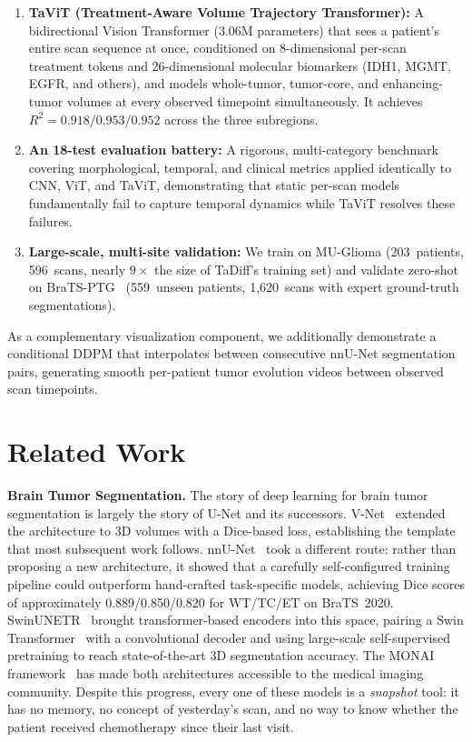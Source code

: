\documentclass[conference]{IEEEtran}
\begin{document}
\begin{enumerate}
    \item \textbf{TaViT (Treatment-Aware Volume Trajectory Transformer):} A bidirectional Vision Transformer (3.06M parameters) that sees a patient's entire scan sequence at once, conditioned on 8-dimensional per-scan treatment tokens and 26-dimensional molecular biomarkers (IDH1, MGMT, EGFR, and others), and models whole-tumor, tumor-core, and enhancing-tumor volumes at every observed timepoint simultaneously. It achieves $R^2 = 0.918/0.953/0.952$ across the three subregions.

    \item \textbf{An 18-test evaluation battery:} A rigorous, multi-category benchmark covering morphological, temporal, and clinical metrics applied identically to CNN, ViT, and TaViT, demonstrating that static per-scan models fundamentally fail to capture temporal dynamics while TaViT resolves these failures.

    \item \textbf{Large-scale, multi-site validation:} We train on MU-Glioma (203~patients, 596~scans, nearly $9\times$ the size of TaDiff's training set) and validate zero-shot on BraTS-PTG~\cite{deverdier2024bratsptg} (559~unseen patients, 1,620~scans with expert ground-truth segmentations).
\end{enumerate}

As a complementary visualization component, we additionally demonstrate a conditional DDPM that interpolates between consecutive nnU-Net segmentation pairs, generating smooth per-patient tumor evolution videos between observed scan timepoints.


\section{Related Work}

\textbf{Brain Tumor Segmentation.}
The story of deep learning for brain tumor segmentation is largely the story of U-Net and its successors. V-Net~\cite{milletari2016vnet} extended the architecture to 3D volumes with a Dice-based loss, establishing the template that most subsequent work follows. nnU-Net~\cite{isensee2021nnunet} took a different route: rather than proposing a new architecture, it showed that a carefully self-configured training pipeline could outperform hand-crafted task-specific models, achieving Dice scores of approximately 0.889/0.850/0.820 for WT/TC/ET on BraTS~2020. SwinUNETR~\cite{tang2022swinunetr} brought transformer-based encoders into this space, pairing a Swin Transformer~\cite{liu2021swin} with a convolutional decoder and using large-scale self-supervised pretraining to reach state-of-the-art 3D segmentation accuracy. The MONAI framework~\cite{cardoso2022monai} has made both architectures accessible to the medical imaging community. Despite this progress, every one of these models is a \emph{snapshot} tool: it has no memory, no concept of yesterday's scan, and no way to know whether the patient received chemotherapy since their last visit.
\end{document}

